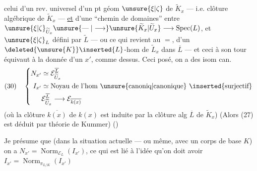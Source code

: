 celui d'un rev. universel   d'un pt géom $\unsure{\xi|\zeta}$ de $\widetilde K_x$ --- i.e.  clôture algébrique de $\widetilde K_x$ --- \uline{et} d'une  ``chemin de domaines'' entre $\unsure{\xi|\zeta}_{\widetilde U_x}\unsure{\mathrel{\text{---}}|\longrightarrow}\unsure{\widetilde K_x|\widetilde U_x}\longrightarrow\operatorname{Spec}(L)$, et $\unsure{\xi|\zeta}_L$ défini par $\widetilde L$ --- ou ce qui revient au $=$,  d'un $\deleted{\unsure{K}}\inserted{L}$-hom de   $\widetilde L_x$ dans $\overline L$ --- et ceci à son tour équivaut à la donnée d'un $x'$,  comme dessus. Ceci posé, on a des isom can.
\[
(30)\quad\left\{\begin{aligned}
N_{x'}&\simeq\mathcal E_{\widetilde U_x}^{\overline L}\\
I_{x'}&\simeq\text{Noyau de l'hom \unsure{canoniq|canonique} }\inserted{\text{surjectif}}\\
&\mathcal E_{\widetilde U_x}^{\overline L}\longrightarrow\mathcal E_{\overline{k(x)}}
\end{aligned}\right.
\]
(où la clôture  $\overline{k(x)}$ de $k(x)$ est induite par la clôture alg $\overline L$ de $\widetilde K_x$)
(Alors (27) est déduit par théorie de Kummer)
()

Je présume que (dans la situation actuelle --- ou même, avec un corps de base $K$) on a $N_{x'}=\operatorname{Norm}_{\mathcal E_L}(I_{x'})$,  ce qui est lié à l'idée qu'on doit avoir $I_{x'}=\operatorname{Norm}_{\pi_{L/K}}(I_{x'})$
